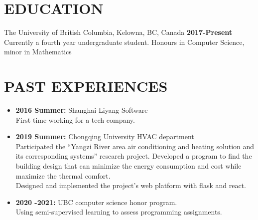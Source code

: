 \documentclass{res}
\begin{document}

\address{\textbf{Email:} jimmy123good@hotmail.com \\
        \textbf{Github: }https://github.com/ailrk \\
         \textbf{Blog:}    https://ailrk.github.io/home \\
         \textbf{Contact:}  (250) 899 2600}
\begin{resume}

\section{EDUCATION}
The University of British Columbia, Kelowna, BC, Canada  \hspace{1.2in} \textbf{2017-Present}\\
    Currently a fourth year undergraduate student. Honours in Computer Science, minor in Mathematics \\

\section{PAST EXPERIENCES}
\begin{itemize}[leftmargin=-.1in]
    \setlength\itemsep{-1em}
    \item \textbf{2016 Summer:} Shanghai Liyang Software
    \vspace{0.05in}\\
    First time working for a tech company. \\
    \item \textbf{2019 Summer:} Chongqing University HVAC department
        \vspace{0.05in}\\ Participated the ``Yangzi River area air conditioning and heating solution and its corresponding systems'' research project. Developed a program to find the building design that can minimize the energy consumption and cost while maximize the thermal comfort. \\
     Designed and implemented the project's web platform with flask and react. \\
    \item \textbf{2020 -2021: } UBC computer science honor program. \\
        \vspace{0.05in} Using semi-supervised learning to assess programming assignments. \\



\end{itemize}
\end{resume}
\end{document}
